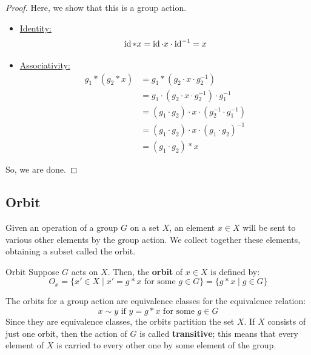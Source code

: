 \documentclass[letterpaper]{article}
\begin{document}
\begin{mdframed}
    \begin{proof}
        Here, we show that this is a group action. 
        \begin{itemize}
            \item \underline{Identity:}
            \[\operatorname{id} * x = \operatorname{id} \cdot x \cdot \operatorname{id}^{-1} = x\]

            \item \underline{Associativity:}
            \begin{equation*}
                \begin{aligned}
                    g_1 * (g_2 * x) &= g_1 * (g_2 \cdot x \cdot g_{2}^{-1}) \\ 
                        &= g_1 \cdot (g_2 \cdot x \cdot g_{2}^{-1}) \cdot g_{1}^{-1} \\ 
                        &= (g_1 \cdot g_2) \cdot x \cdot (g_{2}^{-1} \cdot g_{1}^{-1}) \\ 
                        &= (g_1 \cdot g_2) \cdot x \cdot (g_1 \cdot g_2)^{-1} \\ 
                        &= (g_1 \cdot g_2) * x
                \end{aligned}
            \end{equation*}
        \end{itemize}
        So, we are done. 
    \end{proof}
\end{mdframed}

\subsection{Orbit}
Given an operation of a group $G$ on a set $X$, an element $x \in X$ will be sent to various other elements by the group action. We collect together these elements, obtaining a subset called the orbit. 
\begin{definition}{Orbit}{}
    Suppose $G$ acts on $X$. Then, the \textbf{orbit} of $x \in X$ is defined by: 
    \[O_x = \{x' \in X \mid x' = g * x \text{ for some } g \in G\} = \{g * x \mid g \in G\}\] 
\end{definition}

The orbits for a group action are equivalence classes for the equivalence relation: 
\[x \sim y \text{ if } y = g * x \text{ for some } g \in G\]
Since they are equivalence classes, the orbits partition the set $X$. If $X$ consists of just one orbit, then the action of $G$ is called \textbf{transitive}; this means that every element of $X$ is carried to every other one by some element of the group.
\end{document}

